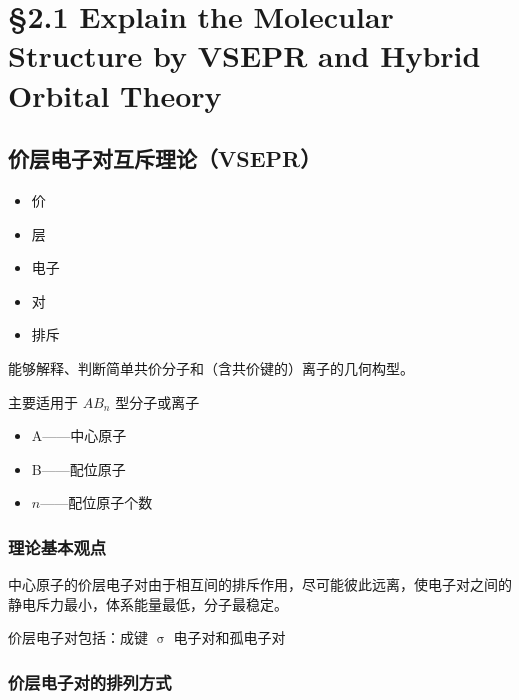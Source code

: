 \section{\S 2.1 Explain the Molecular Structure by VSEPR and Hybrid Orbital Theory}\label{sect:VSEPR和杂化轨道理论}

    \subsection{价层电子对互斥理论（VSEPR）}\label{subsec:VSEPR}

        \begin{itemize}
            \item {}价
            \item {}层
            \item {}电子
            \item {}对
            \item {}排斥
        \end{itemize}

        能够解释、判断简单共价分子和（含共价键的）离子的几何构型。

        主要适用于 \(AB_n\) 型分子或离子

        \begin{itemize}
            \item A——中心原子
            \item B——配位原子
            \item \(n\)——配位原子个数
        \end{itemize}

        \subsubsection{理论基本观点}\label{subsubsec:VSEPR基本观点}

            中心原子的价层电子对由于相互间的排斥作用，尽可能彼此远离，使电子对之间的静电斥力最小，体系能量最低，分子最稳定。

            价层电子对包括：成键 \(\upsigma\) 电子对和孤电子对

        \subsubsection{价层电子对的排列方式}\label{subsubsec:价层电子对排列方式}

